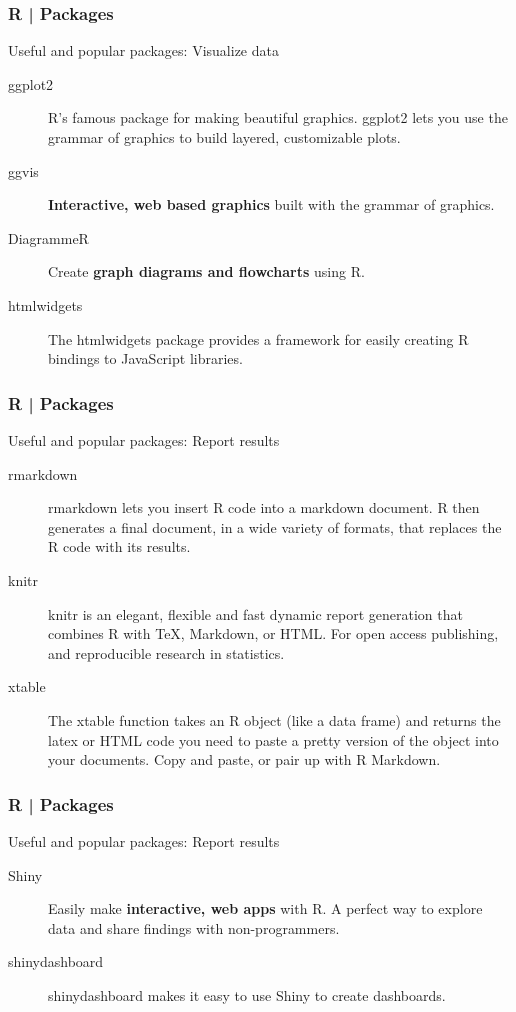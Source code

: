 \begin{frame}
  \frametitle{R | Packages}
  \begin{block}{Useful and popular packages: Visualize data}
    \begin{description}
      \item[\alert{ggplot2}] R's famous package for making beautiful graphics. ggplot2 lets you use \alert{the grammar of graphics} to build layered, customizable plots.
      \item[ggvis] \textbf{Interactive, web based graphics} built with the grammar of graphics.
      \item[DiagrammeR] Create \textbf{graph diagrams and flowcharts} using R.
      \item[htmlwidgets] The htmlwidgets package provides a framework for easily creating R bindings to JavaScript libraries.
    \end{description}
  \end{block}
\end{frame}

\begin{frame}
  \frametitle{R | Packages}
  \begin{block}{Useful and popular packages: Report results}
    \begin{description}
      \item[\alert{rmarkdown}] rmarkdown lets you insert R code into a \alert{markdown document}. R then generates a final document, in a wide variety of formats, that replaces the R code with its results.
      \item[\alert{knitr}] knitr is an elegant, flexible and fast dynamic report generation that combines R with TeX, Markdown, or HTML. For open access publishing, and \alert{reproducible research} in statistics.
      \item[\alert{xtable}] The xtable function takes an R object (like a data frame) and returns the latex or HTML code you need to paste a pretty version of the object into your documents. Copy and paste, or pair up with R Markdown.
    \end{description}
  \end{block}
\end{frame}

\begin{frame}
  \frametitle{R | Packages}
  \begin{block}{Useful and popular packages: Report results}
    \begin{description}
      \item[Shiny] Easily make \textbf{interactive, web apps} with R. A perfect way to explore data and share findings with non-programmers.
      \item[shinydashboard] shinydashboard makes it easy to use Shiny to create dashboards.
    \end{description}
  \end{block}
\end{frame}

